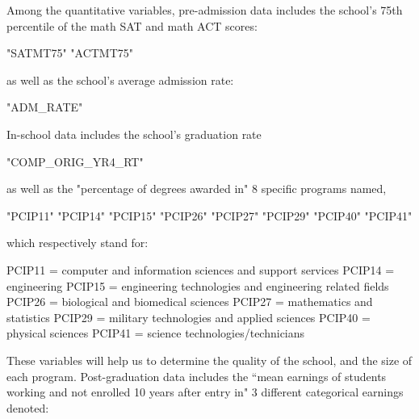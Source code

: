 \documentclass{article}
\begin{document}
Among the quantitative variables, pre-admission data includes the school's 75th percentile of the math SAT and math ACT scores:
\begin{Schunk}
\begin{Soutput}
[1] "SATMT75" "ACTMT75"
\end{Soutput}
\end{Schunk}
as well as the school's average admission rate: 
\begin{Schunk}
\begin{Soutput}
[1] "ADM_RATE"
\end{Soutput}
\end{Schunk}
In-school data includes the school's graduation rate 
\begin{Schunk}
\begin{Soutput}
[1] "COMP_ORIG_YR4_RT"
\end{Soutput}
\end{Schunk}
as well as the "percentage of degrees awarded in" 8 specific programs named, 
\begin{Schunk}
\begin{Soutput}
[1] "PCIP11" "PCIP14" "PCIP15" "PCIP26" "PCIP27" "PCIP29" "PCIP40" "PCIP41"
\end{Soutput}
\end{Schunk}
which respectively stand for:
\begin{center}
\begin{flushleft}
PCIP11 = computer and information sciences and support services \newline
PCIP14 = engineering \newline
PCIP15 = engineering technologies and engineering related fields \newline
PCIP26 = biological and biomedical sciences \newline
PCIP27 = mathematics and statistics \newline
PCIP29 = military technologies and applied sciences \newline
PCIP40 = physical sciences \newline
PCIP41 = science technologies/technicians \newline
\end{flushleft}
\end{center}
These variables will help us to determine the quality of the school, and the size of each program.  Post-graduation data includes the ``mean earnings of students working and not enrolled 10 years after entry in" 3 different categorical earnings denoted:  
\end{document}
